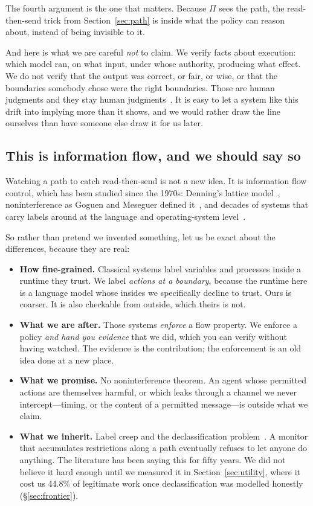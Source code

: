 \documentclass[11pt]{article}
\begin{document}
The fourth argument is the one that matters. Because $\Pi$ sees the path, the
read-then-send trick from Section~\ref{sec:path} is inside what the policy can
reason about, instead of being invisible to it.

And here is what we are careful \emph{not} to claim. We verify facts about
execution: which model ran, on what input, under whose authority, producing
what effect. We do not verify that the output was correct, or fair, or wise,
or that the boundaries somebody chose were the right boundaries. Those are
human judgments and they stay human judgments~\cite{iso42001}. It is easy to
let a system like this drift into implying more than it shows, and we would
rather draw the line ourselves than have someone else draw it for us later.

\subsection{This is information flow, and we should say so}
\label{sec:ifc}

Watching a path to catch read-then-send is not a new idea. It is information
flow control, which has been studied since the 1970s: Denning's lattice
model~\cite{denning1976,denning1977}, noninterference as
Goguen and Meseguer defined it~\cite{goguen1982}, and decades of systems that
carry labels around at the language and operating-system
level~\cite{myers1997,myers1999,sabelfeld2003,histar,flume}.

So rather than pretend we invented something, let us be exact about the
differences, because they are real:

\begin{itemize}[itemsep=2pt,topsep=2pt]
\item \textbf{How fine-grained.} Classical systems label variables and
processes inside a runtime they trust. We label \emph{actions at a boundary},
because the runtime here is a language model whose insides we specifically
decline to trust. Ours is coarser. It is also checkable from outside, which
theirs is not.
\item \textbf{What we are after.} Those systems \emph{enforce} a flow
property. We enforce a policy \emph{and hand you evidence} that we did, which
you can verify without having watched. The evidence is the contribution; the
enforcement is an old idea done at a new place.
\item \textbf{What we promise.} No noninterference theorem. An agent whose
permitted actions are themselves harmful, or which leaks through a channel we
never intercept---timing, or the content of a permitted message---is outside
what we claim.
\item \textbf{What we inherit.} Label creep and the declassification
problem~\cite{sabelfeld2003}. A monitor that accumulates restrictions along a
path eventually refuses to let anyone do anything. The literature has been
saying this for fifty years. We did not believe it hard enough until we
measured it in Section~\ref{sec:utility}, where it cost us 44.8\% of legitimate
work once declassification was modelled honestly (\S\ref{sec:frontier}).
\end{itemize}
\end{document}
